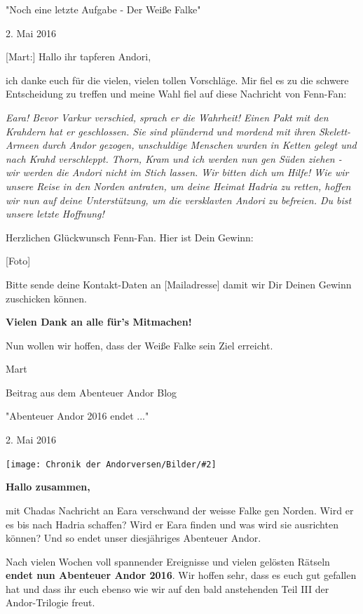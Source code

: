 \documentclass[10pt, a4paper, oneside]{book}
\newcommand{\bildmitts}[2][height=0.32\textwidth,width=0.48\textwidth,keepaspectratio]{%
    \begin{center}
        \texttt{[image: Chronik der Andorversen/Bilder/\#2]}
    \end{center}
}
\begin{document}
\begin{multicols}{2}
\begin{center}
    "Noch eine letzte Aufgabe - Der Weiße Falke"

    2. Mai 2016
\end{center}



[Mart:] Hallo ihr tapferen Andori,

ich danke euch für die vielen, vielen tollen Vorschläge. Mir fiel es zu die schwere Entscheidung zu treffen und meine Wahl fiel auf diese Nachricht von Fenn-Fan:

\textit{Eara! Bevor Varkur verschied, sprach er die Wahrheit! Einen Pakt mit den Krahdern hat er geschlossen. Sie sind plündernd und mordend mit ihren Skelett-Armeen durch Andor gezogen, unschuldige Menschen wurden in Ketten gelegt und nach Krahd verschleppt. Thorn, Kram und ich werden nun gen Süden ziehen - wir werden die Andori nicht im Stich lassen. Wir bitten dich um Hilfe! Wie wir unsere Reise in den Norden antraten, um deine Heimat Hadria zu retten, hoffen wir nun auf deine Unterstützung, um die versklavten Andori zu befreien. Du bist unsere letzte Hoffnung!}

Herzlichen Glückwunsch Fenn-Fan. Hier ist Dein Gewinn:

[Foto]

Bitte sende deine Kontakt-Daten an [Mailadresse] damit wir Dir Deinen Gewinn zuschicken können.

\textbf{Vielen Dank an alle für's Mitmachen!}

Nun wollen wir hoffen, dass der Weiße Falke sein Ziel erreicht.

Mart



\begin{center}
    Beitrag aus dem Abenteuer Andor Blog

    "Abenteuer Andor 2016 endet ..."

    2. Mai 2016
\end{center}


\bildmitts{AA2016 Blog 10.jpeg}


\textbf{Hallo zusammen,}

mit Chadas Nachricht an Eara verschwand der weisse Falke gen Norden. Wird er es bis nach Hadria schaffen? Wird er Eara finden und was wird sie ausrichten können? Und so endet unser diesjähriges Abenteuer Andor.

Nach vielen Wochen voll spannender Ereignisse und vielen gelösten Rätseln \textbf{endet nun Abenteuer Andor 2016}. Wir hoffen sehr, dass es euch gut gefallen hat und dass ihr euch ebenso wie wir auf den bald anstehenden Teil III der Andor-Trilogie freut.


\end{multicols}
\end{document}
